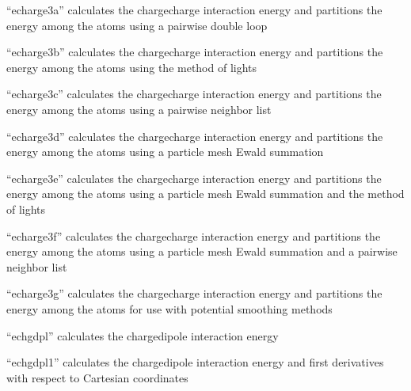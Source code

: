 \documentclass[letterpaper,11pt,english]{sphinxmanual}
\begin{document}
\sphinxAtStartPar
{}

\sphinxAtStartPar
“echarge3a” calculates the charge\sphinxhyphen{}charge interaction energy and partitions the energy among the atoms using a pairwise double loop

\sphinxAtStartPar
{}

\sphinxAtStartPar
“echarge3b” calculates the charge\sphinxhyphen{}charge interaction energy and partitions the energy among the atoms using the method of lights

\sphinxAtStartPar
{}

\sphinxAtStartPar
“echarge3c” calculates the charge\sphinxhyphen{}charge interaction energy and partitions the energy among the atoms using a pairwise neighbor list

\sphinxAtStartPar
{}

\sphinxAtStartPar
“echarge3d” calculates the charge\sphinxhyphen{}charge interaction energy and partitions the energy among the atoms using a particle mesh Ewald summation

\sphinxAtStartPar
{}

\sphinxAtStartPar
“echarge3e” calculates the charge\sphinxhyphen{}charge interaction energy and partitions the energy among the atoms using a particle mesh Ewald summation and the method of lights

\sphinxAtStartPar
{}

\sphinxAtStartPar
“echarge3f” calculates the charge\sphinxhyphen{}charge interaction energy and partitions the energy among the atoms using a particle mesh Ewald summation and a pairwise neighbor list

\sphinxAtStartPar
{}

\sphinxAtStartPar
“echarge3g” calculates the charge\sphinxhyphen{}charge interaction energy and partitions the energy among the atoms for use with potential smoothing methods

\sphinxAtStartPar
{}

\sphinxAtStartPar
“echgdpl” calculates the charge\sphinxhyphen{}dipole interaction energy

\sphinxAtStartPar
{}

\sphinxAtStartPar
“echgdpl1” calculates the charge\sphinxhyphen{}dipole interaction energy and first derivatives with respect to Cartesian coordinates
\end{document}
